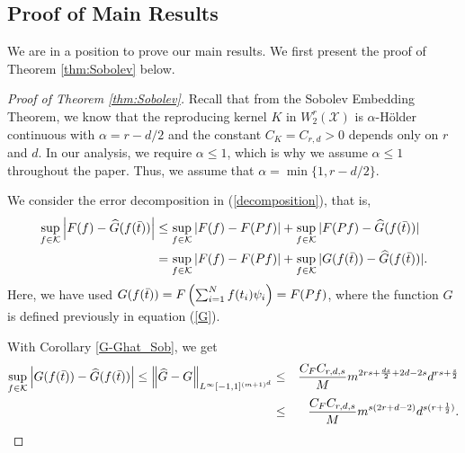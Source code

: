 \documentclass{article}
\numberwithin{equation}{section}
\begin{document}
\begin{appendices}
\section{Proof of Main Results}\label{sec:appendB}

We are in a position to prove our main results. 
We first present the proof of Theorem \ref{thm:Sobolev} below. 


\begin{proof}[Proof of Theorem \ref{thm:Sobolev}]
    Recall that from the Sobolev Embedding Theorem, we know that the reproducing kernel $K$ in $W^r_2(\mathcal{X})$ is $\alpha$-H\"{o}lder continuous with $\alpha = r-d/2$ and the constant $C_K = C_{r,d}>0$ depends only on $r$ and $d$. In our analysis, we require  $\alpha \leq 1$, which is why we assume  $\alpha \leq 1$ throughout the paper. Thus, we assume that $\alpha =\min\{1,r-d/2\}$.
    
    We consider the error decomposition in (\ref{decomposition}), that is,
    \begin{eqnarray*}
         \sup_{f\in \mathcal{K}}\left| F(f) - \widehat{G}(f(\Bar{t}))\right| &\leq  \sup_{f\in \mathcal{K}}| F(f) - F(Pf)| +  \sup_{f\in \mathcal{K}}|F(Pf) - \widehat{G}(f(\Bar{t}))| \\
        &=  \sup_{f\in \mathcal{K}}| F(f) - F(Pf)| +  \sup_{f\in \mathcal{K}}|G(f(\Bar{t})) - \widehat{G}(f(\Bar{t}))|.
    \end{eqnarray*}
Here, we have used $G(f(\Bar{t})) = F\left(\sum_{i=1}^N f(t_i) \psi_i\right) = F(Pf)$, where the function $G$ is defined previously in equation (\ref{G}). 


    With Corollary \ref{G-Ghat_Sob}, we get 
   \begin{eqnarray*}
       \sup_{f\in \mathcal{K}}\left|G(f(\Bar{t})) - \widehat{G}(f(\Bar{t}))\right| \leq \left\|\widehat{G}-G\right\|_{L^\infty [-1,1]^{(m+1)^{d}}}&\leq&\frac{C_FC_{r,d,s}}{M}m^{2rs+\frac{ds}{2}+2d-2s} d^{rs+\frac{s}{2}}\\
       &\leq&\frac{C_FC_{r,d,s}}{M}m^{s(2r+d-2)} d^{s(r+\frac{1}{2})}. 
   \end{eqnarray*}


\end{proof}
\end{appendices}
\end{document}

